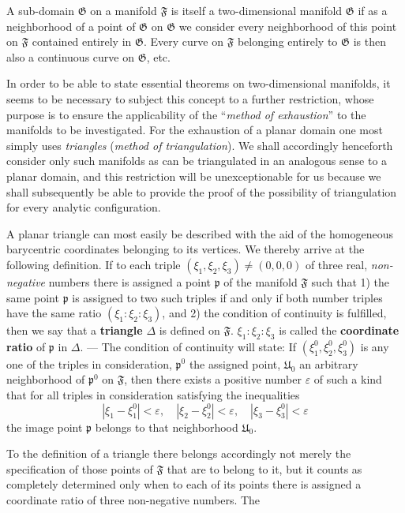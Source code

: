 \documentclass{article}
\begin{document}
A sub-domain $\mathfrak{G}$ on a manifold $\mathfrak{F}$ is itself a two-dimensional manifold $\mathfrak{G}$ if as a neighborhood of a point of $\mathfrak{G}$ on $\mathfrak{G}$ we consider every neighborhood of this point on $\mathfrak{F}$ contained entirely in $\mathfrak{G}$. Every curve on $\mathfrak{F}$ belonging entirely to $\mathfrak{G}$ is then also a continuous curve on $\mathfrak{G}$, etc.

In order to be able to state essential theorems on two-dimensional manifolds, it seems to be necessary to subject this concept to a further restriction, whose purpose is to ensure the applicability of the ``\emph{method of exhaustion}'' to the manifolds to be investigated. For the exhaustion of a planar domain one most simply uses \emph{triangles} (\emph{method of triangulation}). We shall accordingly henceforth consider only such manifolds as can be triangulated in an analogous sense to a planar domain, and this restriction will be unexceptionable for us because we shall subsequently be able to provide the proof of the possibility of triangulation for every analytic configuration.

A planar triangle can most easily be described with the aid of the homogeneous barycentric coordinates belonging to its vertices. We thereby arrive at the following definition. If to each triple $(\xi_1, \xi_2, \xi_3) \ne (0, 0, 0)$ of three real, \emph{non-negative} numbers there is assigned a point $\mathfrak{p}$ of the manifold $\mathfrak{F}$ such that 1) the same point $\mathfrak{p}$ is assigned to two such triples if and only if both number triples have the same ratio $(\xi_1 : \xi_2 : \xi_3)$, and 2) the condition of continuity is fulfilled, then we say that a \textbf{triangle} $\Delta$ is defined on $\mathfrak{F}$. $\xi_1 : \xi_2 : \xi_3$ is called the \textbf{coordinate ratio} of $\mathfrak{p}$ in $\Delta$. --- The condition of continuity will state: If $(\xi_1^0, \xi_2^0, \xi_3^0)$ is any one of the triples in consideration, $\mathfrak{p}^0$ the assigned point, $\mathfrak{U}_0$ an arbitrary neighborhood of $\mathfrak{p}^0$ on $\mathfrak{F}$, then there exists a positive number $\varepsilon$ of such a kind that for all triples in consideration satisfying the inequalities
\[
|\xi_1 - \xi_1^0| < \varepsilon, \quad |\xi_2 - \xi_2^0| < \varepsilon, \quad |\xi_3 - \xi_3^0| < \varepsilon
\]
the image point $\mathfrak{p}$ belongs to that neighborhood $\mathfrak{U}_0$.

To the definition of a triangle there belongs accordingly not merely the specification of those points of $\mathfrak{F}$ that are to belong to it, but it counts as completely determined only when to each of its points there is assigned a coordinate ratio of three non-negative numbers. The
\end{document}
